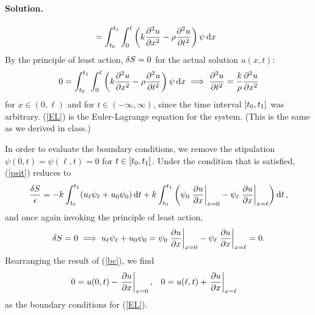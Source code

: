 \documentclass[11pt]{article}
\newcommand{\refeq}[1]{(\ref{#1})}
\newenvironment{solution}
{
    \paragraph{Solution.}
    \ignorespaces
}
{
}
\begin{document}
\begin{solution}
\begin{align}
		&= \int_{t_0}^{t_1} \int_0^\ell \left( k \pdv[2]{u}{x} - \rho \pdv[2]{u}{t} \right) \psi \dd{x}
	\end{align}
	By the principle of least action, $\delta S = 0$ for the actual solution $u(x, t)$:
	\begin{equation} \label{EL}
		0 = \int_{t_0}^{t_1} \int_0^\ell \left( k \pdv[2]{u}{x} - \rho \pdv[2]{u}{t} \right) \psi \dd{x} \implies \pdv[2]{u}{t} = \frac{k}{\rho} \pdv[2]{u}{x}
	\end{equation}
	for $x \in (0, \ell)$ and for $t \in (-\infty, \infty)$, since the time interval $[t_0, t_1]$ was arbitrary.  \refeq{EL} is the Euler-Lagrange equation for the system.  (This is the same as we derived in class.)
	
	In order to evaluate the boundary conditions, we remove the stipulation $\psi(0, t) = \psi(\ell, t) = 0$ for $t \in [t_0, t_1]$.  Under the condition that \label{EL} is satisfied, \refeq{psit} reduces to
	\begin{equation}
		\frac{\delta S}{\epsilon} = - k \int_{t_0}^{t_1} (u_\ell \psi_\ell + u_0 \psi_0) \dd{t} + k \int_{t_0}^{t_1} \left( \psi_0 \left. \pdv{u}{x} \right|_{x=0} - \psi_\ell \left. \pdv{u}{x} \right|_{x=\ell} \right) \dd{t},
	\end{equation}
	and once again invoking the principle of least action,
	\begin{equation} \label{bc}
		\delta S = 0 \implies u_\ell \psi_\ell + u_0 \psi_0 = \psi_0 \left. \pdv{u}{x} \right|_{x=0} - \psi_\ell \left. \pdv{u}{x} \right|_{x=\ell} = 0.
	\end{equation}
	Rearranging the result of \refeq{bc}, we find
	\begin{align}
		0 &= u(0, t) - \left. \pdv{u}{x} \right|_{x=0}, &
		0 &= u(\ell, t) + \left. \pdv{u}{x} \right|_{x=\ell}
	\end{align}
	as the boundary conditions for \refeq{EL}.
	
\end{solution}
	


\end{document}
